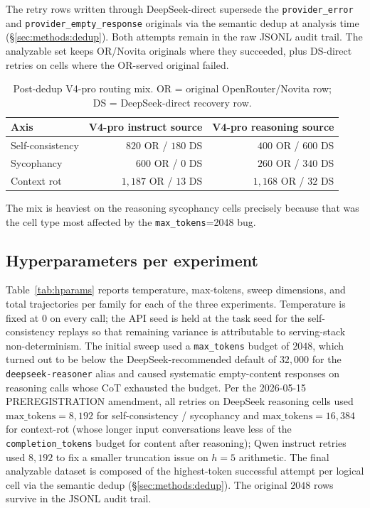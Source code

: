 The retry rows written through DeepSeek-direct supersede the
\texttt{provider\_error} and \texttt{provider\_empty\_response}
originals via the semantic dedup at analysis time
(\S\ref{sec:methods:dedup}). Both attempts remain in the raw JSONL audit
trail. The analyzable set keeps OR/Novita originals where they
succeeded, plus DS-direct retries on cells where the OR-served original
failed.

\begin{table}[!htbp]
\centering
\small
\begin{tabular}{lrr}
\toprule
Axis & V4-pro instruct source & V4-pro reasoning source \\
\midrule
Self-consistency & $820$ OR / $180$ DS & $400$ OR / $600$ DS \\
Sycophancy       & $600$ OR / $0$ DS   & $260$ OR / $340$ DS \\
Context rot      & $1{,}187$ OR / $13$ DS & $1{,}168$ OR / $32$ DS \\
\bottomrule
\end{tabular}
\caption{Post-dedup V4-pro routing mix. OR = original OpenRouter/Novita
row; DS = DeepSeek-direct recovery row.}
\label{tab:v4pro-routing-mix}
\end{table}

The mix is heaviest on the reasoning sycophancy cells precisely because
that was the cell type most affected by the \texttt{max\_tokens}{=}2048
bug.

\subsection{Hyperparameters per experiment}

Table~\ref{tab:hparams} reports temperature, max-tokens, sweep
dimensions, and total trajectories per family for each of the three
experiments. Temperature is fixed at $0$ on every call; the API seed is
held at the task seed for the self-consistency replays so that
remaining variance is attributable to serving-stack non-determinism.
The initial sweep used a \texttt{max\_tokens} budget of $2048$, which
turned out to be below the DeepSeek-recommended default of $32{,}000$ for
the \texttt{deepseek-reasoner} alias and caused systematic
empty-content responses on reasoning calls whose CoT exhausted the
budget. Per the 2026-05-15 PREREGISTRATION amendment, all retries on
DeepSeek reasoning cells used $\mathrm{max\_tokens}{=}8{,}192$ for
self-consistency / sycophancy and $\mathrm{max\_tokens}{=}16{,}384$ for
context-rot (whose longer input conversations leave less of the
\texttt{completion\_tokens} budget for content after reasoning); Qwen
instruct retries used $8{,}192$ to fix a smaller truncation issue on
$h{=}5$ arithmetic. The final analyzable dataset is composed of the
highest-token successful attempt per logical cell via the semantic
dedup (\S\ref{sec:methods:dedup}). The original $2048$ rows survive in
the JSONL audit trail.

